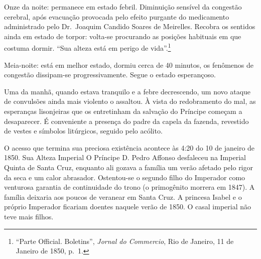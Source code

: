 Onze da noite: permanece em estado febril. Diminuição sensível da
congestão cerebral, após evacuação provocada pelo efeito purgante do
medicamento administrado pelo Dr.~Joaquim Candido Soares de Meirelles.
Recobra os sentidos ainda em estado de torpor: volta-se procurando as
posições habituais em que costuma dormir. ``Sua alteza está em perigo de
vida''.\footnote{``Parte Official. Boletins'', \emph{Jornal do
  Commercio}, Rio de Janeiro, 11 de Janeiro de 1850, p.~1.}

Meia-noite: está em melhor estado, dormiu cerca de 40 minutos, os
fenômenos de congestão dissipam-se progressivamente. Segue o estado
esperançoso.

Uma da manhã, quando estava tranquilo e a febre decrescendo, um novo
ataque de convulsões ainda mais violento o assaltou. À vista do
redobramento do mal, as esperanças lisonjeiras que os entretinham da
salvação do Príncipe começam a desaparecer. É conveniente a presença do
padre da capela da fazenda, revestido de vestes e símbolos litúrgicos,
seguido pelo acólito.

O acesso que termina sua preciosa existência acontece às 4:20 do 10 de
janeiro de 1850. Sua Alteza Imperial O Príncipe D. Pedro Affonso
desfaleceu na Imperial Quinta de Santa Cruz, enquanto ali gozava a
família um verão afetado pelo rigor da seca e um calor abrasador.
Ostentou-se o segundo filho do Imperador como venturosa garantia de
continuidade do trono (o primogênito morrera em 1847). A família
deixaria aos poucos de veranear em Santa Cruz. A princesa Isabel e o
próprio Imperador ficariam doentes naquele verão de 1850. O casal
imperial não teve mais filhos.


